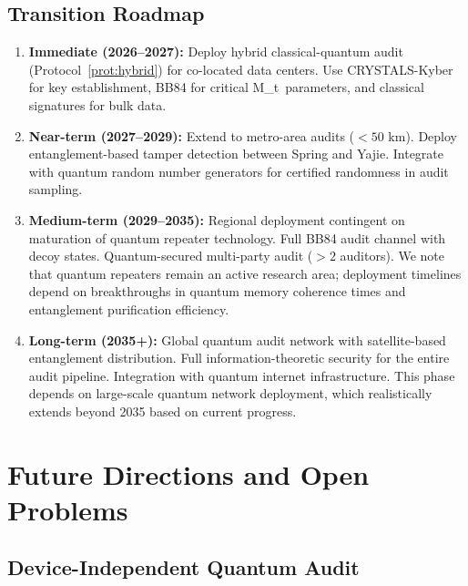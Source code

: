 \documentclass[11pt,a4paper]{article}
\theoremstyle{plain}
\theoremstyle{definition}
\theoremstyle{remark}
\newcommand{\Mt}{M_t}
\begin{document}
\subsection{Transition Roadmap}
\label{sec:roadmap}

\begin{enumerate}[label=\textbf{Phase \arabic*:}, leftmargin=*]
  \item \textbf{Immediate (2026--2027):} Deploy hybrid classical-quantum
        audit (Protocol~\ref{prot:hybrid}) for co-located data centers.
        Use CRYSTALS-Kyber for key establishment, BB84 for critical
        \Mt\ parameters, and classical signatures for bulk data.

  \item \textbf{Near-term (2027--2029):} Extend to metro-area audits
        ($<50$ km). Deploy entanglement-based tamper detection between
        Spring and Yajie. Integrate with quantum random number generators
        for certified randomness in audit sampling.

  \item \textbf{Medium-term (2029--2035):} Regional deployment contingent
        on maturation of quantum repeater technology. Full BB84 audit
        channel with decoy states. Quantum-secured multi-party audit
        ($>2$ auditors). We note that quantum repeaters remain an active
        research area; deployment timelines depend on breakthroughs in
        quantum memory coherence times and entanglement purification
        efficiency.

  \item \textbf{Long-term (2035+):} Global quantum audit network
        with satellite-based entanglement distribution. Full
        information-theoretic security for the entire audit pipeline.
        Integration with quantum internet infrastructure. This phase
        depends on large-scale quantum network deployment, which
        realistically extends beyond 2035 based on current progress.
\end{enumerate}

\section{Future Directions and Open Problems}
\label{sec:future}

\subsection{Device-Independent Quantum Audit}
\end{document}
